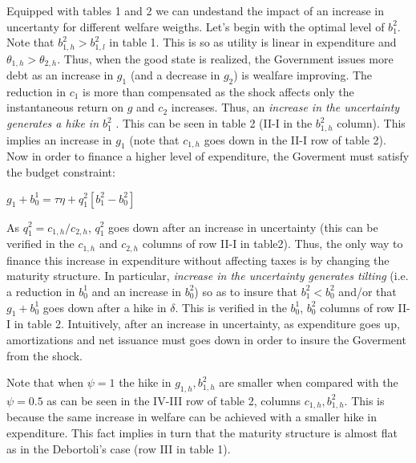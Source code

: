 \documentclass[11pt,letterpaper]{article}
\begin{document}
Equipped with tables 1 and 2 we can undestand the impact of an increase in uncertanty for different welfare weigths. Let's begin with the optimal level of $b^{2}_{1}$. Note that $b^{2}_{1,h}>b^{2}_{1,l}$ in table 1. This is so as utility is linear in expenditure and $\theta _{1,h}>\theta _{2,h}$. Thus, when the good state is realized, the Government issues more debt as an increase in $g _{1}$ (and a decrease in $g _{2}$) is wealfare improving. The reduction in $c _{1}$ is more than compensated as the shock affects only the instantaneous return on $g$ and  $c _{2}$ increases. Thus, an \textit{increase in the uncertainty generates a hike in $b^{2}_{1}$ }. This can be seen in table 2 (II-I in the  $b^{2}_{1,h}$ column). This implies an increase in $g_1$ (note that $c_{1,h}$ goes down in the II-I row of table 2).  Now in order to finance a higher level of expenditure, the Goverment must satisfy the budget constraint:

\bigskip


\begin{center}
$g_1+b_0^1=\tau \eta +q_{1}^{2}\left [ b_{1}^{2}-b_{0}^{2} \right ]$
\end{center}

\bigskip

As $q_{1}^{2}=c_{1,h}/c_{2,h}$, $q_{1}^{2}$ goes down after an increase in uncertainty (this can be verified in the $c_{1,h}$ and $c_{2,h}$ columns of row II-I in table2). Thus, the only way to finance this increase in expenditure without affecting taxes is by changing the maturity structure. In particular, \textit{increase in the uncertainty generates tilting} (i.e. a reduction in $b_{0}^{1}$  and an increase in $b_{0}^{2}$) so as to insure that $b_{1}^{2}<b_{0}^{2}$ and/or that $g_1+b_0^1$ goes down after a hike in $\delta$. This is verified in the $b_{0}^{1}$, $b_{0}^{2}$  columns of row II-I in table 2. Intuitively, after an increase in uncertainty, as expenditure goes up, amortizations and net issuance must goes down in order to insure the Goverment from the shock.

\bigskip

Note that when $\psi=1$ the hike in $g_{1,h}, b^2_{1,h} $ are smaller when compared with the $\psi=0.5$ as can be seen in the IV-III row of table 2, columns $c_{1,h}, b^2_{1,h} $. This is because the same increase in welfare can be achieved with a smaller hike in expenditure. This fact implies in turn that the maturity structure is almost flat as in the Debortoli's case (row III in table 1).

\bigskip
\end{document}
